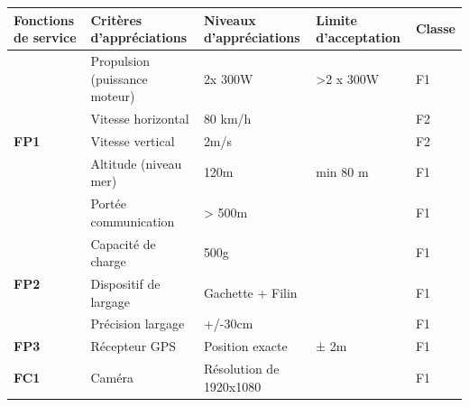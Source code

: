 \documentclass[a4paper,12pt,french]{report}
\begin{document}
\begin{table}[H]
    \begin{tabularx}{18.5cm}{|p{2cm}|l|p{4.5cm}|p{2cm}|X|}
        \hline
        \textbf{Fonctions de service} & \textbf{Critères d’appréciations}    & \textbf{Niveaux d’appréciations} & \textbf{Limite d’acceptation} & \textbf{Classe} \\
        \hline
        \multirow{5}{*}{\textbf{FP1}}
                                      & Propulsion (puissance moteur)        & 2x 300W                          & >2 x 300W                     & F1              \\
                                      & Vitesse horizontal                   & 80 km/h                          &                               & F2              \\
                                      & Vitesse vertical                     & 2m/s                             &                               & F2              \\
                                      & Altitude (niveau mer)
                                      & 120m                                 & min 80 m                         & F1                                              \\
                                      & Portée communication                 & > 500m                           &                               & F1              \\
        \hline
        \multirow{3}{*}{\textbf{FP2}}
                                      & Capacité de charge                   & 500g                             &                               & F1              \\
                                      & Dispositif de largage                & Gachette + Filin                 &                               & F1              \\
                                      & Précision largage                    & +/-30cm                          &                               & F1              \\
        \hline
        \textbf{FP3}                  & Récepteur GPS                        & Position exacte                  & ± 2m                          & F1              \\
        \hline
        \multirow{2}{*}{\textbf{FC1}}
                                      & Caméra                               & Résolution de 1920x1080          &                               & F1              \\

\end{tabularx}
\end{table}
\end{document}
